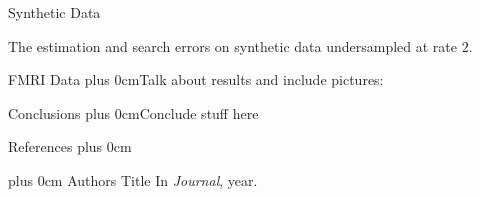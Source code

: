 \documentclass[final,hyperref={pdfpagelabels=false}]{beamer}
\renewcommand{\raggedright}{\leftskip=0.5cm \rightskip=0.5cm plus 0cm}
\begin{document}
\begin{frame}{}
\begin{columns}[t]
\begin{column}{.48\linewidth}
\begin{block}{\Large Synthetic Data}
        \begin{minipage}{.95\textwidth}
        \vspace{5 mm}
           The estimation and search errors on synthetic data undersampled at rate $2$. 
        \end{minipage}%
        \end{block}
        
        \begin{block}{\Large FMRI Data}
          \raggedright Talk about results and include pictures: \vskip5cm
          \vskip5.5cm
        \end{block}

        \begin{block}{\Large Conclusions}
          \raggedright Conclude stuff here
        \end{block}
        \begin{block}{References}
          \raggedright
          \footnotesize
          \begin{thebibliography}{2}
            \raggedright
            Authors
            \newblock Title
            \newblock In \emph{Journal}, year.
          \end{thebibliography}
        \end{block}
      \end{column}
    \end{columns}
  \end{frame}
\end{document}

